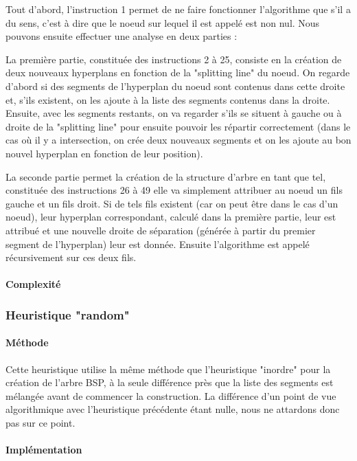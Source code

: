 \documentclass[11pt,a4paper]{article}
\begin{document}
Tout d'abord, l'instruction 1 permet de ne faire fonctionner l'algorithme que s'il a du sens, c'est à dire que le noeud sur lequel il est appelé est non nul. Nous pouvons ensuite effectuer une analyse en deux parties : 

La première partie, constituée des instructions 2 à 25, consiste en la création de deux nouveaux hyperplans en fonction de la "splitting line" du noeud. On regarde d'abord si des segments de l'hyperplan du noeud sont contenus dans cette droite et, s'ils existent, on les ajoute à la liste des segments contenus dans la droite. Ensuite, avec les segments restants, on va regarder s'ils se situent à gauche ou à droite de la "splitting line" pour ensuite pouvoir les répartir correctement (dans le cas où il y a intersection, on crée deux nouveaux segments et on les ajoute au bon nouvel hyperplan en fonction de leur position). 

La seconde partie permet la création de la structure d'arbre en tant que tel, constituée des instructions 26 à 49 elle va simplement attribuer au noeud un fils gauche et un fils droit. Si de tels fils existent (car on peut être dans le cas d'un noeud), leur hyperplan correspondant, calculé dans la première partie, leur est attribué et une nouvelle droite de séparation (générée à partir du premier segment de l'hyperplan) leur est donnée. Ensuite l'algorithme est appelé récursivement sur ces deux fils. 

\paragraph{Complexité}

\subsubsection{Heuristique "random"}

\paragraph{Méthode}

Cette heuristique utilise la même méthode que l'heuristique "inordre" pour la création de l'arbre BSP, à la seule différence près que la liste des segments est mélangée avant de commencer la construction. La différence d'un point de vue algorithmique avec l'heuristique précédente étant nulle, nous ne attardons donc pas sur ce point. 

\paragraph{Implémentation}
\end{document}
